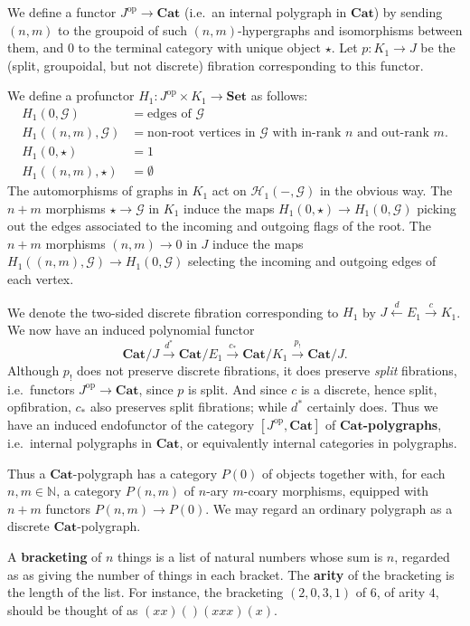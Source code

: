 \documentclass{article}
\theoremstyle{definition}
\theoremstyle{remark}
\def\G{\mathcal{G}}
\def\H{\mathcal{H}}
\def\Set{\mathbf{Set}}
\def\Cat{\ensuremath{\mathbf{Cat}}}
\def\op{^{\mathrm{op}}}
\let\xto\xrightarrow
\let\xot\xleftarrow
\def\N{\mathbb{N}}
\begin{document}
We define a functor $J\op\to\Cat$ (i.e.\ an internal polygraph in $\Cat$) by sending $(n,m)$ to the groupoid of such $(n,m)$-hypergraphs and isomorphisms between them, and $0$ to the terminal category with unique object $\star$.
Let $p:K_1 \to J$ be the (split, groupoidal, but not discrete) fibration corresponding to this functor.

We define a profunctor $H_1 : J\op\times K_1 \to \Set$ as follows:
\begin{align*}
  H_1(0,\G) &= \text{edges of $\G$}\\
  H_1((n,m),\G) &= \text{non-root vertices in $\G$ with in-rank $n$ and out-rank $m$}.\\
  H_1(0,\star) &= 1\\
  H_1((n,m),\star) &= \emptyset
\end{align*}
The automorphisms of graphs in $K_1$ act on $\H_1(-,\G)$ in the obvious way.
The $n+m$ morphisms $\star\to\G$ in $K_1$ induce the maps $H_1(0,\star) \to H_1(0,\G)$ picking out the edges associated to the incoming and outgoing flags of the root.
The $n+m$ morphisms $(n,m)\to 0$ in $J$ induce the maps $H_1((n,m),\G) \to H_1 (0,\G)$ selecting the incoming and outgoing edges of each vertex.

We denote the two-sided discrete fibration corresponding to $H_1$ by $J \xot{d} E_1 \xto{c} K_1$.
We now have an induced polynomial functor
\[ \Cat/J \xto{d^*} \Cat/E_1 \xto{c_*} \Cat/K_1 \xto{p_!} \Cat/J. \]
Although $p_!$ does not preserve discrete fibrations, it does preserve \emph{split} fibrations, i.e.\ functors $J\op\to\Cat$, since $p$ is split.
And since $c$ is a discrete, hence split, opfibration, $c_*$ also preserves split fibrations; while $d^*$ certainly does.
Thus we have an induced endofunctor of the category $[J\op,\Cat]$ of \textbf{\Cat-polygraphs}, i.e.\ internal polygraphs in \Cat, or equivalently internal categories in polygraphs.


Thus a \Cat-polygraph has a category $P(0)$ of objects together with, for each $n,m\in\N$, a category $P(n,m)$ of $n$-ary $m$-coary morphisms, equipped with $n+m$ functors $P(n,m) \to P(0)$.
We may regard an ordinary polygraph as a discrete \Cat-polygraph.

A \textbf{bracketing} of $n$ things is a list of natural numbers whose sum is $n$, regarded as as giving the number of things in each bracket.
The \textbf{arity} of the bracketing is the length of the list.
For instance, the bracketing $(2,0,3,1)$ of $6$, of arity $4$, should be thought of as $(xx)()(xxx)(x)$.
\end{document}
